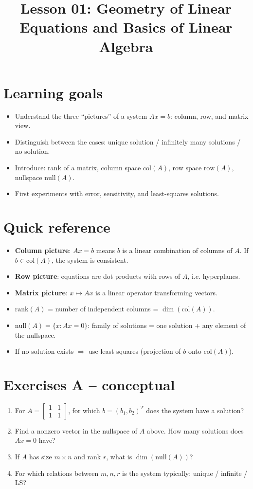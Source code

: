 \documentclass[12pt]{article}
\title{Lesson 01: Geometry of Linear Equations and Basics of Linear Algebra}
\author{}
\date{}
\begin{document}
\maketitle

\section*{Learning goals}
\begin{itemize}[label=$\triangleright$]
\item Understand the three “pictures” of a system $Ax=b$: column, row, and matrix view.
\item Distinguish between the cases: unique solution / infinitely many solutions / no solution.
\item Introduce: rank of a matrix, column space $\mathrm{col}(A)$, row space $\mathrm{row}(A)$, nullspace $\mathrm{null}(A)$.
\item First experiments with error, sensitivity, and least-squares solutions.
\end{itemize}

\section*{Quick reference}
\begin{itemize}[label=$\ast$]
\item \textbf{Column picture}: $Ax=b$ means $b$ is a linear combination of columns of $A$. If $b \in \mathrm{col}(A)$, the system is consistent.
\item \textbf{Row picture}: equations are dot products with rows of $A$, i.e. hyperplanes.
\item \textbf{Matrix picture}: $x \mapsto Ax$ is a linear operator transforming vectors.
\item $\mathrm{rank}(A)$ = number of independent columns = $\dim(\mathrm{col}(A))$.
\item $\mathrm{null}(A)=\{x:Ax=0\}$: family of solutions = one solution + any element of the nullspace.
\item If no solution exists $\Rightarrow$ use least squares (projection of $b$ onto $\mathrm{col}(A)$).
\end{itemize}

\section*{Exercises A – conceptual}
\begin{enumerate}[label=\textbf{A\arabic*}]
\item For $A=\begin{bmatrix}1&1\\1&1\end{bmatrix}$, for which $b=(b_1,b_2)^T$ does the system have a solution?
\item Find a nonzero vector in the nullspace of $A$ above. How many solutions does $Ax=0$ have?
\item If $A$ has size $m\times n$ and rank $r$, what is $\dim(\mathrm{null}(A))$?
\item For which relations between $m,n,r$ is the system typically: unique / infinite / LS?
\end{enumerate}
\end{document}
